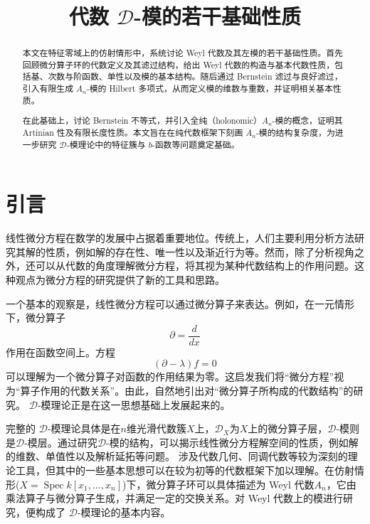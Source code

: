 \documentclass[11pt]{article}
\title{代数 $\mathcal{D}$-模的若干基础性质}
\theoremstyle{plain}
\theoremstyle{definition}
\theoremstyle{remark}
\newcommand{\Spec}{\operatorname{Spec}}
\begin{document}
\maketitle

\begin{abstract}
    本文在特征零域上的仿射情形中，系统讨论 Weyl 代数及其左模的若干基础性质。首先回顾微分算子环的代数定义及其滤过结构，给出 Weyl 代数的构造与基本代数性质，包括基、次数与阶函数、单性以及模的基本结构。随后通过 Bernstein 滤过与良好滤过，引入有限生成 $A_n$-模的 Hilbert 多项式，从而定义模的维数与重数，并证明相关基本性质。

    在此基础上，讨论 Bernstein 不等式，并引入全纯（holonomic）$A_n$-模的概念，证明其 Artinian 性及有限长度性质。本文旨在在纯代数框架下刻画 $A_n$-模的结构复杂度，为进一步研究 $\mathcal{D}$-模理论中的特征簇与 $b$-函数等问题奠定基础。
\end{abstract}


\tableofcontents

\section{引言}

线性微分方程在数学的发展中占据着重要地位。传统上，人们主要利用分析方法研究其解的性质，例如解的存在性、唯一性以及渐近行为等。然而，除了分析视角之外，还可以从代数的角度理解微分方程，将其视为某种代数结构上的作用问题。这种观点为微分方程的研究提供了新的工具和思路。

一个基本的观察是，线性微分方程可以通过微分算子来表达。例如，在一元情形下，微分算子
\[
    \partial = \frac{d}{dx}
\]
作用在函数空间上。方程
\[
    (\partial - \lambda)f = 0
\]
可以理解为一个微分算子对函数的作用结果为零。这启发我们将“微分方程”视为“算子作用的代数关系”。由此，自然地引出对“微分算子所构成的代数结构”的研究。
$\mathcal{D}$-模理论正是在这一思想基础上发展起来的。



完整的 $\mathcal{D}$-模理论具体是在$n$维光滑代数簇$X$上，$\mathcal{D}_X$为$X$上的微分算子层，$\mathcal{D}$-模则是$\mathcal{D}$-模层。通过研究$\mathcal{D}$-模的结构，可以揭示线性微分方程解空间的性质，例如解的维数、单值性以及解析延拓等问题。
涉及代数几何、同调代数等较为深刻的理论工具，但其中的一些基本思想可以在较为初等的代数框架下加以理解。在仿射情形($X=\Spec k[x_1,\ldots,x_n]$)下，微分算子环可以具体描述为 Weyl 代数$A_n$，它由乘法算子与微分算子生成，并满足一定的交换关系。对 Weyl 代数上的模进行研究，便构成了 $\mathcal{D}$-模理论的基本内容。
\end{document}
